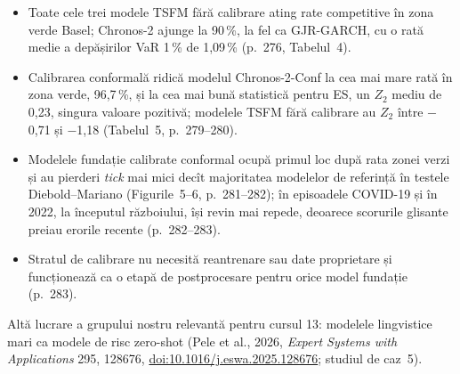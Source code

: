 \textbf{}
\begin{itemize}
\item {}%
{Toate cele trei modele TSFM fără calibrare ating rate competitive în zona verde Basel; Chronos-2 ajunge la 90\,\%, la fel ca GJR-GARCH, cu o rată medie a depășirilor VaR 1\,\% de 1,09\,\% (p.~276, Tabelul~4).}
\item {}%
{Calibrarea conformală ridică modelul Chronos-2-Conf la cea mai mare rată în zona verde, 96,7\,\%, și la cea mai bună statistică pentru ES, un $Z_2$ mediu de 0,23, singura valoare pozitivă; modelele TSFM fără calibrare au $Z_2$ între $-$0,71 și $-$1,18 (Tabelul~5, p.~279--280).}
\item {}%
{Modelele fundație calibrate conformal ocupă primul loc după rata zonei verzi și au pierderi \emph{tick} mai mici decît majoritatea modelelor de referință în testele Diebold--Mariano (Figurile~5--6, p.~281--282); în episoadele COVID-19 și în 2022, la începutul războiului, își revin mai repede, deoarece scorurile glisante preiau erorile recente (p.~282--283).}
\item {}%
{Stratul de calibrare nu necesită reantrenare sau date proprietare și funcționează ca o etapă de postprocesare pentru orice model fundație (p.~283).}
\end{itemize}
{\footnotesize\color{FooterGray}%
{Altă lucrare a grupului nostru relevantă pentru cursul 13: modelele lingvistice mari ca modele de risc zero-shot (Pele et al., 2026, \emph{Expert Systems with Applications} 295, 128676, \href{https://doi.org/10.1016/j.eswa.2025.128676}{doi:10.1016/j.eswa.2025.128676}; studiul de caz~5).}}

